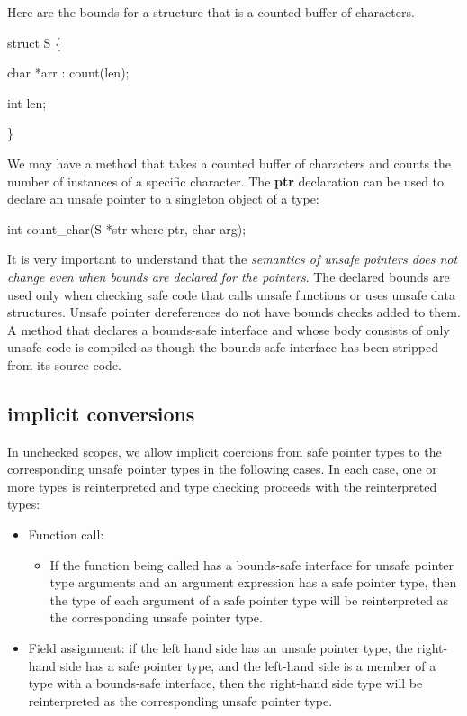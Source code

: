 Here are the bounds for a structure that is a counted buffer of
characters.

struct S \{

char *arr : count(len);

int len;

\}

We may have a method that takes a counted buffer of characters and
counts the number of instances of a specific character. The \textbf{ptr}
declaration can be used to declare an unsafe pointer to a singleton
object of a type:

int count\_char(S *str where ptr, char arg);

It is very important to understand that the \emph{semantics of unsafe
pointers does not change even when bounds are declared for the
pointers}. The declared bounds are used only when checking safe code
that calls unsafe functions or uses unsafe data structures. Unsafe
pointer dereferences do not have bounds checks added to them. A method
that declares a bounds-safe interface and whose body consists of only
unsafe code is compiled as though the bounds-safe interface has been
stripped from its source code.

\subsection{\texorpdfstring{\protect\hypertarget{ux5fRef424639711}{}{\protect\hypertarget{ux5fToc426641114}{}{\protect\hypertarget{ux5fToc435434973}{}{\protect\hypertarget{ux5fToc437460804}{}{\protect\hypertarget{ux5fToc440445485}{}{\protect\hypertarget{ux5fToc440449267}{}{\protect\hypertarget{ux5fToc440551917}{}{}}}}}}}implicit
conversions}{implicit conversions}}\label{implicit-conversions}

In unchecked scopes, we allow implicit coercions from safe pointer types
to the corresponding unsafe pointer types in the following cases. In
each case, one or more types is reinterpreted and type checking proceeds
with the reinterpreted types:

\begin{itemize}
\item
  Function call:

  \begin{itemize}
  \item
    If the function being called has a bounds-safe interface for unsafe
    pointer type arguments and an argument expression has a safe pointer
    type, then the type of each argument of a safe pointer type will be
    reinterpreted as the corresponding unsafe pointer type.
  \end{itemize}
\item
  Field assignment: if the left hand side has an unsafe pointer type,
  the right-hand side has a safe pointer type, and the left-hand side is
  a member of a type with a bounds-safe interface, then the right-hand
  side type will be reinterpreted as the corresponding unsafe pointer
  type.
\end{itemize}

